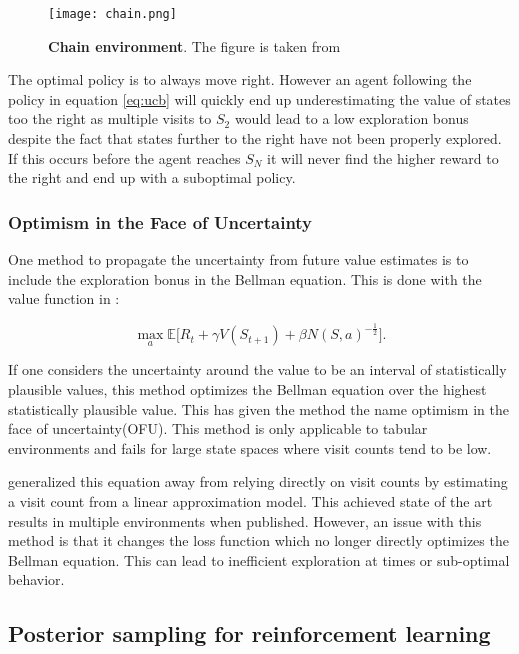 \begin{figure}[H]
    \centering
    \texttt{[image: chain.png]}
    \caption{\textbf{Chain environment}. The figure is taken from \cite{osband_2016}}
    \label{fig:chain}
\end{figure}

The optimal policy is to always move right. However an agent following the policy in equation \ref{eq:ucb} will quickly end up underestimating the value of states too the right as multiple visits to $S_2$ would lead to a low exploration bonus despite the fact that states further to the right have not been properly explored. If this occurs before the agent reaches $S_N$ it will never find the higher reward to the right and end up with a suboptimal policy.

\subsubsection{Optimism in the Face of Uncertainty}

One method to propagate the uncertainty from future value estimates is to include the exploration bonus in the Bellman equation. This is done with the value function in \cite{strehl_2008}:

\begin{equation}
    \max_a \mathbb{E}\Big[R_t+\gamma V(S_{t+1})+\beta N(S,a)^{-\frac{1}{2}}\Big].
\end{equation}

If one considers the uncertainty around the value to be an interval of statistically plausible values, this method optimizes the Bellman equation over the highest statistically plausible value. This has given the method the name optimism in the face of uncertainty(OFU). This method is only applicable to tabular environments and fails for large state spaces where visit counts tend to be low.

\cite{bellemare_2016} generalized this equation away from relying directly on visit counts by estimating a visit count from a linear approximation model. This achieved state of the art results in multiple environments when published. However, an issue with this method is that it changes the loss function which no longer directly optimizes the Bellman equation. This can lead to inefficient exploration at times or sub-optimal behavior. \citep{moerland_2017} 

\subsection{Posterior sampling for reinforcement learning}


